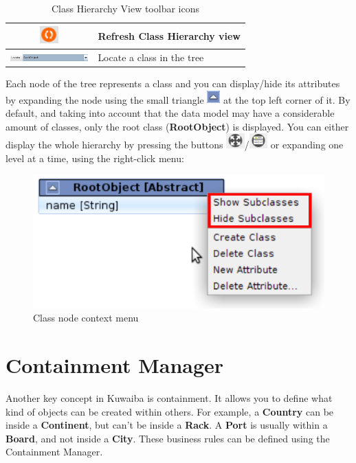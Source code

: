 \documentclass[a4paper]{article}
\begin{document}
\begin{table}[h!]
\begin{tabular}{cp{10cm}}
					\midrule
					\includegraphics[width=0.7cm]{img/icon_refresh_view.png} & Refresh Class Hierarchy view\\
					\midrule
					\includegraphics[width=3cm]{img/data_model_manager_locate.png} & Locate a class in the tree\\
				\end{tabular}
				\caption{Class Hierarchy View toolbar icons}
				\label{tab:class_hierarchy_view_icons}
			\end{table}
			
			Each node of the tree represents a class and you can display/hide its attributes by expanding the node using the small triangle \includegraphics[width=0.5cm]{img/data_model_manager_triangle.png} at the top left corner of it. By default, and taking into account that the data model may have a considerable amount of classes, only the root class (\textbf{RootObject}) is displayed. You can either display the whole hierarchy by pressing the buttons \includegraphics[width=0.7cm]{img/icon_expand_all.png}/\includegraphics[width=0.7cm]{img/icon_expand_all_with_attributes.png} or expanding one level at a time, using the right-click menu:
			\begin{figure}[h!]
				\centering
				\includegraphics[width=0.5\linewidth]{img/data_model_manager_menu.png}
				\caption{Class node context menu}
				\label{fig:class_hierarchy_context_menu}
			\end{figure}
				
	\clearpage
	\section{Containment Manager} \label{sec:containment_manager}
	Another key concept in Kuwaiba is containment. It allows you to define what kind of objects can be created within others. For example, a \textbf{Country} can be inside a \textbf{Continent}, but can't be inside a \textbf{Rack}. A \textbf{Port} is usually within a \textbf{Board}, and not inside a \textbf{City}. These business rules can be defined using the Containment Manager.
	
\end{document}
